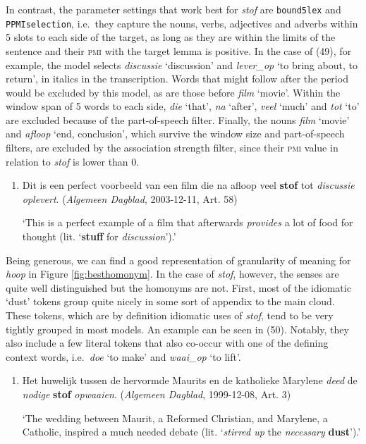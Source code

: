 \documentclass[
]{book}
\begin{document}
In contrast, the parameter settings that work best for \emph{stof} are \texttt{bound5lex} and \texttt{PPMIselection}, i.e.~they capture the nouns, verbs, adjectives and adverbs within 5 slots to each side of the target, as long as they are within the limits of the sentence and their \textsc{pmi} with the target lemma is positive. In the case of (49), for example, the model selects \emph{discussie} `discussion' and \emph{lever\_op} `to bring about, to return', in italics in the transcription. Words that might follow after the period would be excluded by this model, as are those before \emph{film} `movie'. Within the window span of 5 words to each side, \emph{die} `that', \emph{na} `after', \emph{veel} `much' and \emph{tot} `to' are excluded because of the part-of-speech filter. Finally, the nouns \emph{film} `movie' and \emph{afloop} `end, conclusion', which survive the window size and part-of-speech filters, are excluded by the association strength filter, since their \textsc{pmi} value in relation to \emph{stof} is lower than 0.

\begin{enumerate}
\def\labelenumi{(\arabic{enumi})}
\setcounter{enumi}{48}
\item
  Dit is een perfect voorbeeld van een film die na afloop veel \textbf{stof} tot \emph{discussie} \emph{oplevert}. (\emph{Algemeen Dagblad}, 2003-12-11, Art. 58)

  `This is a perfect example of a film that afterwards \emph{provides} a lot of food for thought (lit. `\textbf{stuff} for \emph{discussion}').'
\end{enumerate}

Being generous, we can find a good representation of granularity of meaning for \emph{hoop} in Figure \ref{fig:besthomonym}. In the case of \emph{stof}, however, the senses are quite well distinguished but the homonyms are not.
First, most of the idiomatic `dust' tokens group quite nicely in some sort of appendix to the main cloud. These tokens, which are by definition idiomatic uses of \emph{stof}, tend to be very tightly grouped in most models. An example can be seen in (50). Notably, they also include a few literal tokens that also co-occur with one of the defining context words, i.e.~\emph{doe} `to make' and \emph{waai\_op} `to lift'.

\begin{enumerate}
\def\labelenumi{(\arabic{enumi})}
\setcounter{enumi}{49}
\item
  Het huwelijk tussen de hervormde Maurits en de katholieke Marylene \emph{deed} de \emph{nodige} \textbf{stof} \emph{opwaaien}. (\emph{Algemeen Dagblad}, 1999-12-08, Art. 3)

  `The wedding between Maurit, a Reformed Christian, and Marylene, a Catholic, inspired a much needed debate (lit. `\emph{stirred up} the \emph{necessary} \textbf{dust}').'
\end{enumerate}
\end{document}

